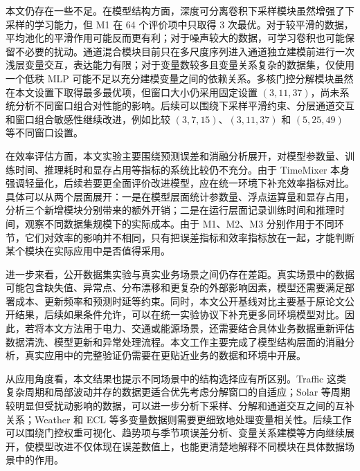 本文仍存在一些不足。在模型结构方面，深度可分离卷积下采样模块虽然增强了下采样的学习能力，但 M1 在 64 个评价项中只取得 3 次最优。对于较平滑的数据，平均池化的平滑作用可能反而更有利；对于噪声较大的数据，可学习卷积也可能保留不必要的扰动。通道混合模块目前只在多尺度序列进入通道独立建模前进行一次浅层变量交互，表达能力有限；对于变量数较多且变量关系复杂的数据集，仅使用一个低秩 MLP 可能不足以充分建模变量之间的依赖关系。多核门控分解模块虽然在本文设置下取得最多最优项，但窗口大小仍采用固定设置 $(3,11,37)$，尚未系统分析不同窗口组合对性能的影响。后续可以围绕下采样平滑约束、分层通道交互和窗口组合敏感性继续改进，例如比较 $(3,7,15)$、$(3,11,37)$ 和 $(5,25,49)$ 等不同窗口设置。

在效率评估方面，本文实验主要围绕预测误差和消融分析展开，对模型参数量、训练时间、推理耗时和显存占用等指标的系统比较仍不充分。由于 TimeMixer 本身强调轻量化，后续若要更全面评价改进模型，应在统一环境下补充效率指标对比。具体可以从两个层面展开：一是在模型层面统计参数量、浮点运算量和显存占用，分析三个新增模块分别带来的额外开销；二是在运行层面记录训练时间和推理时间，观察不同数据集规模下的实际成本。由于 M1、M2、M3 分别作用于不同环节，它们对效率的影响并不相同，只有把误差指标和效率指标放在一起，才能判断某个模块在实际应用中是否值得采用。

进一步来看，公开数据集实验与真实业务场景之间仍存在差距。真实场景中的数据可能包含缺失值、异常点、分布漂移和更复杂的外部影响因素，模型还需要满足部署成本、更新频率和预测时延等约束。同时，本文公开基线对比主要基于原论文公开结果，后续如果条件允许，可以在统一实验协议下补充更多同环境模型对比。因此，若将本文方法用于电力、交通或能源场景，还需要结合具体业务数据重新评估数据清洗、模型更新和异常处理流程。本文工作主要完成了模型结构层面的消融分析，真实应用中的完整验证仍需要在更贴近业务的数据和环境中开展。

从应用角度看，本文结果也提示不同场景中的结构选择应有所区别。Traffic 这类复杂周期和局部波动并存的数据更适合优先考虑分解窗口的自适应；Solar 等周期较明显但受扰动影响的数据，可以进一步分析下采样、分解和通道交互之间的互补关系；Weather 和 ECL 等多变量数据则需要更细致地处理变量相关性。后续工作可以围绕门控权重可视化、趋势项与季节项误差分析、变量关系建模等方向继续展开，使模型改进不仅体现在误差数值上，也能更清楚地解释不同模块在具体数据场景中的作用。
